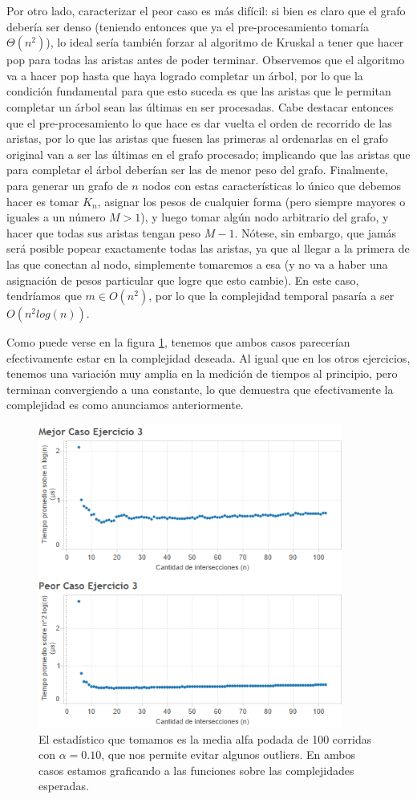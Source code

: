 \documentclass{article}
\theoremstyle{definition}
\theoremstyle{remark}
\begin{document}
Por otro lado, caracterizar el peor caso es más difícil: si bien es claro que el grafo debería ser denso (teniendo entonces que ya el pre-procesamiento tomaría $\Theta(n^2)$), lo ideal sería también forzar al algoritmo de Kruskal a tener que hacer pop para todas las aristas antes de poder terminar. Observemos que el algoritmo va a hacer pop hasta que haya logrado completar un árbol, por lo que la condición fundamental para que esto suceda es que las aristas que le permitan completar un árbol sean las últimas en ser procesadas. Cabe destacar entonces que el pre-procesamiento lo que hace es dar vuelta el orden de recorrido de las aristas, por lo que las aristas que fuesen las primeras al ordenarlas en el grafo original van a ser las últimas en el grafo procesado; implicando que las aristas que para completar el árbol deberían ser las de menor peso del grafo. Finalmente, para generar un grafo de $n$ nodos con estas características lo único que debemos hacer es tomar $K_n$, asignar los pesos de cualquier forma (pero siempre mayores o iguales a un número $M > 1$), y luego tomar algún nodo arbitrario del grafo, y hacer que todas sus aristas tengan peso $M - 1$. Nótese, sin embargo, que jamás será posible popear exactamente todas las aristas, ya que al llegar a la primera de las que conectan al nodo, simplemente tomaremos a esa (y no va a haber una asignación de pesos particular que logre que esto cambie). En este caso, tendríamos que $m \in O(n^2)$, por lo que la complejidad temporal pasaría a ser $O(n^2 log(n))$.

Como puede verse en la figura \ref{grf:ex3}, tenemos que ambos casos parecerían efectivamente estar en la complejidad deseada. Al igual que en los otros ejercicios, tenemos una variación muy amplia en la medición de tiempos al principio, pero terminan convergiendo a una constante, lo que demuestra que efectivamente la complejidad es como anunciamos anteriormente.

\begin{figure}
\centering
\includegraphics[width=10cm]{ex3}
\caption{El estadístico que tomamos es la media alfa podada de 100 corridas con $\alpha = 0.10$, que nos permite evitar algunos outliers. En ambos casos estamos graficando a las funciones sobre las complejidades esperadas.\label{grf:ex3}}
\end{figure}
\end{document}
